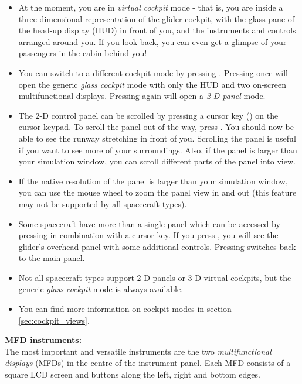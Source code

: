 \documentclass[Orbiter User Manual.tex]{subfiles}
\begin{document}
\begin{itemize}
\item At the moment, you are in \textit{virtual cockpit} mode - that is, you are inside a three-dimensional representation of the glider cockpit, with the glass pane of the head-up display (HUD) in front of you, and the instruments and controls arranged around you. If you look back, you can even get a glimpse of your passengers in the cabin behind you!
\item You can switch to a different cockpit mode by pressing . Pressing  once will open the generic \textit{glass cockpit} mode with only the HUD and two on-screen multifunctional displays. Pressing  again will open a \textit{2-D panel} mode.
\item The 2-D control panel can be scrolled by pressing a cursor key (\DArrow\UArrow\RArrow\LArrow) on the cursor keypad. To scroll the panel out of the way, press \UArrow. You should now be able to see the runway stretching in front of you. Scrolling the panel is useful if you want to see more of your surroundings. Also, if the panel is larger than your simulation window, you can scroll different parts of the panel into view.
\item If the native resolution of the panel is larger than your simulation window, you can use the mouse wheel to zoom the panel view in and out (this feature may not be supported by all spacecraft types).
\item Some spacecraft have more than a single panel which can be accessed by pressing \Ctrl in combination with a cursor key. If you press \Ctrl\UArrow, you will see the glider's overhead panel with some additional controls. Pressing \Ctrl\DArrow switches back to the main panel.
\item Not all spacecraft types support 2-D panels or 3-D virtual cockpits, but the generic \textit{glass cockpit} mode is always available.
\item You can find more information on cockpit modes in section \ref{sec:cockpit_views}.
\end{itemize}

\noindent
\textbf{MFD instruments:}\\
The most important and versatile instruments are the two \textit{multifunctional displays} (MFDs) in the centre of the instrument panel. Each MFD consists of a square LCD screen and buttons along the left, right and bottom edges.
\end{document}
